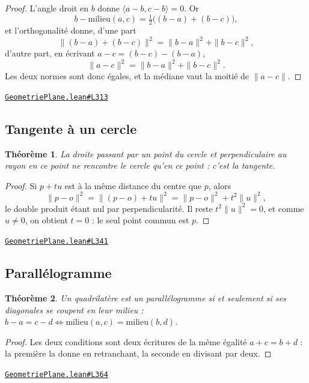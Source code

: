 \documentclass[11pt,a4paper]{article}
\theoremstyle{definition}
\theoremstyle{plain}
\newtheorem{theoreme}{Théorème}
\newcommand{\source}[2]{\par\smallskip\noindent\hfill{\footnotesize\href{#1}{\texttt{#2}}}\par\smallskip}
\begin{document}
\begin{proof}
L'angle droit en $b$ donne $\langle a - b, c - b\rangle = 0$. Or
\[ b - \text{milieu}(a,c) = \tfrac{1}{2}\bigl((b-a) + (b-c)\bigr) , \]
et l'orthogonalité donne, d'une part
\[ \|(b-a) + (b-c)\|^2 = \|b-a\|^2 + \|b-c\|^2 , \]
d'autre part, en écrivant $a - c = (b-c) - (b-a)$,
\[ \|a-c\|^2 = \|b-a\|^2 + \|b-c\|^2 . \]
Les deux normes sont donc égales, et la médiane vaut la moitié de $\|a - c\|$.
\end{proof}
\source{https://github.com/Commutator-IO/learn-lean/blob/main/cours/01-college/02-geometrie-plane/GeometriePlane.lean\#L313}{GeometriePlane.lean\#L313}

\subsection{Tangente à un cercle}

\begin{theoreme}
La droite passant par un point du cercle et perpendiculaire au rayon en ce point ne
rencontre le cercle qu'en ce point : c'est la tangente.
\end{theoreme}

\begin{proof}
Si $p + tu$ est à la même distance du centre que $p$, alors
\[ \|p - o\|^2 = \|(p-o) + tu\|^2 = \|p-o\|^2 + t^2\|u\|^2 , \]
le double produit étant nul par perpendicularité. Il reste $t^2\|u\|^2 = 0$, et comme
$u \ne 0$, on obtient $t = 0$ : le seul point commun est $p$.
\end{proof}
\source{https://github.com/Commutator-IO/learn-lean/blob/main/cours/01-college/02-geometrie-plane/GeometriePlane.lean\#L341}{GeometriePlane.lean\#L341}

\subsection{Parallélogramme}

\begin{theoreme}
Un quadrilatère est un parallélogramme si et seulement si ses diagonales se coupent en
leur milieu : $b - a = c - d \iff \text{milieu}(a,c) = \text{milieu}(b,d)$.
\end{theoreme}

\begin{proof}
Les deux conditions sont deux écritures de la même égalité $a + c = b + d$ : la
première la donne en retranchant, la seconde en divisant par deux.
\end{proof}
\source{https://github.com/Commutator-IO/learn-lean/blob/main/cours/01-college/02-geometrie-plane/GeometriePlane.lean\#L364}{GeometriePlane.lean\#L364}
\end{document}
